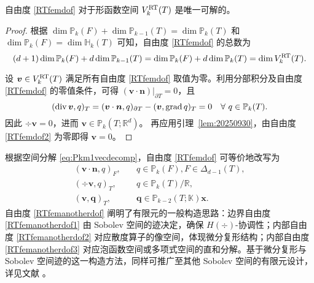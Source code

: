 \begin{lemma}\label{lem:unisovlenRTfem}
自由度 \eqref{RTfemdof} 对于形函数空间 $V_k^{\rm RT}(T)$ 是唯一可解的。
\end{lemma}
\begin{proof}
根据 $\dim\mathbb P_{k}(F)+\dim\mathbb P_{k-1}(T)=\dim\mathbb P_{k}(T)$ 和 $\dim\mathbb P_{k}(F)=\dim \mathbb H_{k}(T)$ 可知，自由度 \eqref{RTfemdof} 的总数为
\begin{equation*}
(d+1)\dim\mathbb P_{k}(F)+d\dim\mathbb P_{k-1}(T) = \dim\mathbb P_{k}(F)+d\dim\mathbb P_{k}(T) = \dim V_k^{\rm RT}(T).
\end{equation*}

设 $\boldsymbol{v}\in V_k^{\rm RT}(T)$ 满足所有自由度 \eqref{RTfemdof} 取值为零。利用分部积分及自由度 \eqref{RTfemdof} 的零值条件，可得 $(\boldsymbol{v}\cdot\boldsymbol{n})|_{\partial T}=0$，且 
\begin{equation*}
(\operatorname{div}\boldsymbol{v}, q)_T=(\boldsymbol{v}\cdot\boldsymbol{n},q)_{\partial T} - (\boldsymbol{v},\operatorname{grad} q)_T=0\quad\forall~q\in \mathbb P_{k}(T).
\end{equation*}
因此 $\div\boldsymbol{v}=0$，进而 $\boldsymbol{v}\in \mathbb P_{k}(T; \mathbb R^d)$。
再应用引理~\ref{lem:20250930}，由自由度 \eqref{RTfemdof2} 为零即得 $\boldsymbol{v}=0$。
\end{proof}

根据空间分解 \eqref{eq:Pkm1vecdecomp}，自由度 \eqref{RTfemdof} 可等价地改写为
\begin{subequations}\label{RTfemanotherdof}
\begin{align}
(\boldsymbol v\cdot\boldsymbol  n, q)_F, & \quad q\in\mathbb P_{k}(F),  F\in\Delta_{d-1}(T),\label{RTfemanotherdof1}\\
(\div\boldsymbol v, q)_T, & \quad q\in\mathbb P_{k}(T)/\mathbb R, \label{RTfemanotherdof2}\\
(\boldsymbol v, \boldsymbol q)_T, & \quad \boldsymbol q\in\mathbb P_{k-2}(T;\mathbb K)\boldsymbol x. \label{RTfemanotherdof3}
\end{align}
\end{subequations} 
自由度 \eqref{RTfemanotherdof} 阐明了有限元的一般构造思路：边界自由度 \eqref{RTfemanotherdof1} 由 Sobolev 空间的迹决定，确保 $H(\div)$-协调性；内部自由度 \eqref{RTfemanotherdof2} 对应散度算子的像空间，体现微分复形结构；内部自由度 \eqref{RTfemanotherdof3} 对应泡函数空间或多项式空间的直和分解。基于微分复形与 Sobolev 空间迹的这一构造方法，同样可推广至其他 Sobolev 空间的有限元设计，详见文献 \cite{ChenHuang2022}。


